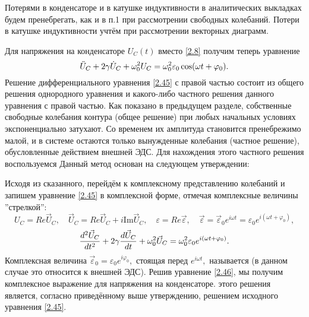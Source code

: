 Потерями в конденсаторе и в катушке индуктивности в аналитических выкладках будем пренебрегать, как и в п.1 при рассмотрении свободных колебаний. Потери в катушке индуктивности учтём при рассмотрении векторных диаграмм.

Для напряжения на конденсаторе $U_C(t)$ вместо \eqref{2.8} получим теперь уравнение
\begin{equation}\eqmark{2.45}
\ddot{U}_C+2\gamma \dot{U}_C+\omega_0^2U_C=\omega_0^2\varepsilon_0\cos(\omega t+ \varphi_0).
\end{equation}
Решение  дифференциального уравнения \eqref{2.45} с правой частью состоит из общего решения однородного уравнения и какого-либо частного решения данного уравнения с правой частью. Как показано в предыдущем разделе, собственные свободные колебания контура (общее решение) при любых начальных условиях экспоненциально затухают. Со временем их амплитуда становится пренебрежимо малой, и в системе остаются только вынужденные колебания (частное решение), обусловленные действием внешней ЭДС. Для нахождения этого частного решения воспользуемся  Данный метод основан на следующем утверждении: 

Исходя из сказанного, перейдём к комплексному представлению колебаний и запишем уравнение \eqref{2.45} в комплексной форме, отмечая комплексные величины ''стрелкой'':
\begin{equation*}
U_C=Re\vec U_C, \quad \vec U_C=Re\vec U_C+i\text{Im}\vec U_C, \quad \varepsilon=Re\vec \varepsilon, \quad \vec \varepsilon=\vec \varepsilon_0e^{i\omega t}=\varepsilon_0e^{i(\omega t+\varphi_0)},
\end{equation*}
\begin{equation}\eqmark{2.46}
\dfrac{d^2\vec U_C}{dt^2}+2\gamma\dfrac{d\vec U_C}{dt}+\omega_0^2\vec U_C=\omega_0^2\varepsilon_0e^{i(\omega t+\varphi_0)}.
\end{equation}
Комплексная величина $\vec \varepsilon_0=\varepsilon_0e^{i\varphi_0},$ стоящая перед $e^{i\omega t},$ называется  (в данном случае это относится к внешней ЭДС). Решив уравнение \eqref{2.46}, мы получим комплексное выражение для напряжения на конденсаторе.  этого решения является, согласно приведённому выше утверждению, решением исходного уравнения \eqref{2.45}.

